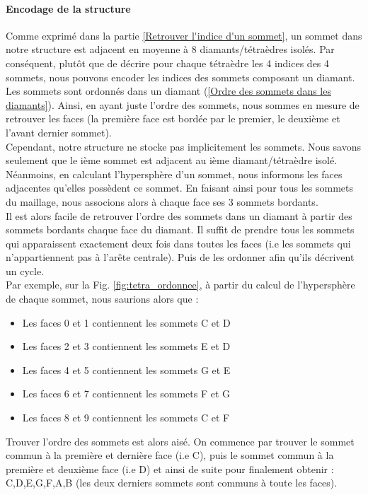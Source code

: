 \paragraph{Encodage de la structure}
Comme exprimé dans la partie \ref{Retrouver l'indice d'un sommet}, un sommet dans notre structure est adjacent en moyenne à 8 diamants/tétraèdres isolés. Par conséquent, plutôt que de décrire pour chaque tétraèdre les 4 indices des 4 sommets, nous pouvons encoder les indices des sommets composant un diamant. Les sommets sont ordonnés dans un diamant (\ref{Ordre des sommets dans les diamants}). Ainsi, en ayant juste l'ordre des sommets, nous sommes en mesure de retrouver les faces (la première face est bordée par le premier, le deuxième et l'avant dernier sommet).\\
Cependant, notre structure ne stocke pas implicitement les sommets. Nous savons seulement que le ième sommet est adjacent au ième diamant/tétraèdre isolé. Néanmoins, en calculant l'hypersphère d'un sommet, nous informons les faces adjacentes qu'elles possèdent ce sommet. En faisant ainsi pour tous les sommets du maillage, nous associons alors à chaque face ses 3 sommets bordants.\\
Il est alors facile de retrouver l'ordre des sommets dans un diamant à partir des sommets bordants chaque face du diamant. Il suffit de prendre tous les sommets qui apparaissent exactement deux fois dans toutes les faces (i.e les sommets qui n'appartiennent pas à l'arête centrale). Puis de les ordonner afin qu'ils décrivent un cycle.\\
Par exemple, sur la Fig. \ref{fig:tetra_ordonnee}, à partir du calcul de l'hypersphère de chaque sommet, nous saurions alors que :
\begin{itemize}
\item Les faces 0 et 1 contiennent les sommets C et D
\item Les faces 2 et 3 contiennent les sommets E et D
\item Les faces 4 et 5 contiennent les sommets G et E
\item Les faces 6 et 7 contiennent les sommets F et G
\item Les faces 8 et 9 contiennent les sommets C et F\\
\end{itemize}
Trouver l'ordre des sommets est alors aisé. On commence par trouver le sommet commun à la première et dernière face (i.e C), puis le sommet commun à la première et deuxième face (i.e D) et ainsi de suite pour finalement obtenir : C,D,E,G,F,A,B (les deux derniers sommets sont communs à toute les faces).

